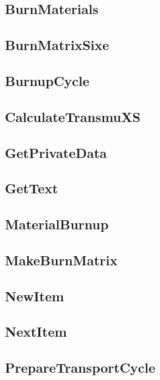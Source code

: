 \subsection{BurnMaterials}


\subsection{BurnMatrixSixe}


\subsection{BurnupCycle}


\subsection{CalculateTransmuXS}


\subsection{GetPrivateData}


\subsection{GetText}


\subsection{MaterialBurnup}


\subsection{MakeBurnMatrix}


\subsection{NewItem}


\subsection{NextItem}


\subsection{PrepareTransportCycle}


